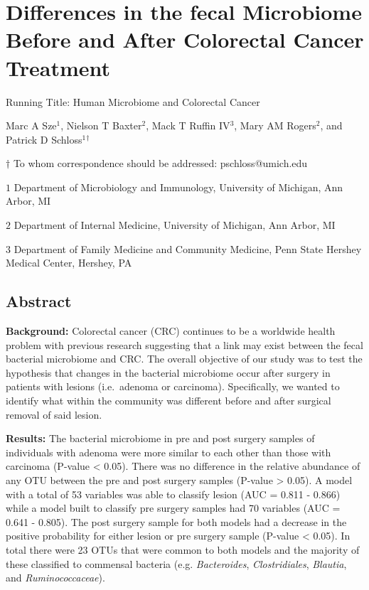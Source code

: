 \documentclass[12pt,]{article}
\title{}
\author{}
\date{}
\begin{document}
\section{Differences in the fecal Microbiome Before and After Colorectal
Cancer
Treatment}\label{differences-in-the-fecal-microbiome-before-and-after-colorectal-cancer-treatment}

\vspace{25mm}

\begin{center}
Running Title: Human Microbiome and Colorectal Cancer

\vspace{10mm}

Marc A Sze${^1}$, Nielson T Baxter${^2}$, Mack T Ruffin IV${^3}$, Mary AM Rogers${^2}$, and Patrick D Schloss${^1}$${^\dagger}$

\vspace{20mm}

$\dagger$ To whom correspondence should be addressed: pschloss@umich.edu

$1$ Department of Microbiology and Immunology, University of Michigan, Ann Arbor, MI

$2$ Department of Internal Medicine, University of Michigan, Ann Arbor, MI   

$3$ Department of Family Medicine and Community Medicine, Penn State Hershey Medical Center, Hershey, PA    


\end{center}

\newpage

\linenumbers

\subsection{Abstract}\label{abstract}

\textbf{Background:} Colorectal cancer (CRC) continues to be a worldwide
health problem with previous research suggesting that a link may exist
between the fecal bacterial microbiome and CRC. The overall objective of
our study was to test the hypothesis that changes in the bacterial
microbiome occur after surgery in patients with lesions (i.e.~adenoma or
carcinoma). Specifically, we wanted to identify what within the
community was different before and after surgical removal of said
lesion.

\textbf{Results:} The bacterial microbiome in pre and post surgery
samples of individuals with adenoma were more similar to each other than
those with carcinoma (P-value \textless{} 0.05). There was no difference
in the relative abundance of any OTU between the pre and post surgery
samples (P-value \textgreater{} 0.05). A model with a total of 53
variables was able to classify lesion (AUC = 0.811 - 0.866) while a
model built to classify pre surgery samples had 70 variables (AUC =
0.641 - 0.805). The post surgery sample for both models had a decrease
in the positive probability for either lesion or pre surgery sample
(P-value \textless{} 0.05). In total there were 23 OTUs that were common
to both models and the majority of these classified to commensal
bacteria (e.g. \emph{Bacteroides}, \emph{Clostridiales}, \emph{Blautia},
and \emph{Ruminococcaceae}).
\end{document}
